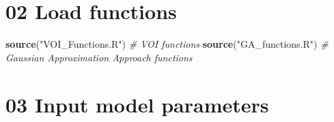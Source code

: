 \documentclass[
]{article}
\newenvironment{Shaded}{\begin{snugshade}}{\end{snugshade}}
\newcommand{\CommentTok}[1]{\textcolor[rgb]{0.56,0.35,0.01}{\textit{#1}}}
\newcommand{\KeywordTok}[1]{\textcolor[rgb]{0.13,0.29,0.53}{\textbf{#1}}}
\newcommand{\NormalTok}[1]{#1}
\newcommand{\StringTok}[1]{\textcolor[rgb]{0.31,0.60,0.02}{#1}}
\begin{document}
\hypertarget{load-functions}{%
\section{02 Load functions}\label{load-functions}}

\begin{Shaded}
\begin{Highlighting}[]
\KeywordTok{source}\NormalTok{(}\StringTok{"VOI_Functions.R"}\NormalTok{) }\CommentTok{# VOI functions }
\KeywordTok{source}\NormalTok{(}\StringTok{"GA_functions.R"}\NormalTok{)  }\CommentTok{# Gaussian Approximation Approach functions}
\end{Highlighting}
\end{Shaded}

\hypertarget{input-model-parameters}{%
\section{03 Input model parameters}\label{input-model-parameters}}
\end{document}
